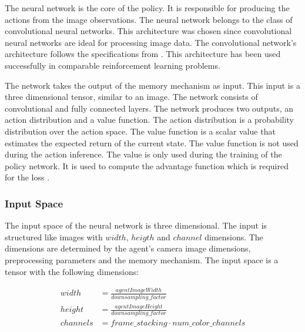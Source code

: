 The neural network is the core of the policy. It is responsible for producing the actions from the image observations. The neural network belongs to the class of convolutional neural networks. This architecture was chosen since convolutional neural networks are ideal for processing image data. The convolutional network's architecture follows the specifications from \autocite{human_level_control}. This architecture has been used successfully in comparable reinforcement learning problems.

The network takes the output of the memory mechanism as input. This input is a three dimensional tensor, similar to an image. The network consists of convolutional and fully connected layers. The network produces two outputs, an action distribution and a value function. The action distribution is a probability distribution over the action space. 
The value function is a scalar value that estimates the expected return of the current state. The value function is not used during the action inference. The value is only used during the training of the policy network. It is used to compute the advantage function which is required for the loss \autocite{ppo}.




\subsubsection{Input Space}

The input space of the neural network is three dimensional. The input is structured like images with $width$, $heigth$ and $channel$ dimensions. The dimensions are determined by the agent's camera image dimensions, preprocessing parameters and the memory mechanism. The input space is a tensor with the following dimensions:

\begin{align*}
    width &= \frac{agentImageWidth}{downsampling\_factor} \\   
    height &= \frac{agentImageHeight}{downsampling\_factor} \\     
    channels &= frame\_stacking \cdot num\_color\_channels
\end{align*}

